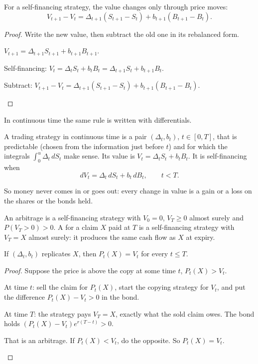 \begin{result}
\label{res:gains-discrete}
For a self-financing strategy, the value changes only through price moves:
\[
  V_{t+1}-V_t=\Delta_{t+1}(S_{t+1}-S_t)+b_{t+1}(B_{t+1}-B_t).
\]
\end{result}
\begin{proof}
Write the new value, then subtract the old one in its rebalanced form.
\begin{steps}
  \item $V_{t+1}=\Delta_{t+1}S_{t+1}+b_{t+1}B_{t+1}$.
  \item Self-financing: $V_t=\Delta_tS_t+b_tB_t=\Delta_{t+1}S_t+b_{t+1}B_t$.
  \item Subtract: $V_{t+1}-V_t=\Delta_{t+1}(S_{t+1}-S_t)+b_{t+1}(B_{t+1}-B_t)$. \qedhere
\end{steps}
\end{proof}

In continuous time the same rule is written with differentials.

\begin{definition}
\label{def:selffin-cont}
A trading strategy in continuous time is a pair $(\Delta_t,b_t)$, $t\in[0,T]$, that is predictable (chosen from the information just before $t$) and for which the integrals $\int_0^u\Delta_t\,dS_t$ make sense. Its value is $V_t=\Delta_tS_t+b_tB_t$. It is self-financing when
\[
  dV_t=\Delta_t\,dS_t+b_t\,dB_t,\qquad t<T.
\]
\end{definition}

So money never comes in or goes out: every change in value is a gain or a loss on the shares or the bonds held.

\begin{definition}
\label{def:arb-cont}
An arbitrage is a self-financing strategy with $V_0=0$, $V_T\ge0$ almost surely and $P(V_T>0)>0$. A  for a claim $X$ paid at $T$ is a self-financing strategy with $V_T=X$ almost surely: it produces the same cash flow as $X$ at expiry.
\end{definition}

\begin{result}
\label{res:price-copy}
If $(\Delta_t,b_t)$ replicates $X$, then $P_t(X)=V_t$ for every $t\le T$.
\end{result}
\begin{proof}
Suppose the price is above the copy at some time $t$, $P_t(X)>V_t$.
\begin{steps}
  \item At time $t$: sell the claim for $P_t(X)$, start the copying strategy for $V_t$, and put the difference $P_t(X)-V_t>0$ in the bond.
  \item At time $T$: the strategy pays $V_T=X$, exactly what the sold claim owes. The bond holds $(P_t(X)-V_t)e^{r(T-t)}>0$.
  \item That is an arbitrage. If $P_t(X)<V_t$, do the opposite. So $P_t(X)=V_t$. \qedhere
\end{steps}
\end{proof}

